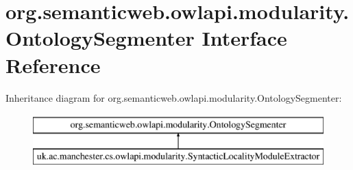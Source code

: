 \hypertarget{interfaceorg_1_1semanticweb_1_1owlapi_1_1modularity_1_1_ontology_segmenter}{\section{org.\-semanticweb.\-owlapi.\-modularity.\-Ontology\-Segmenter Interface Reference}
\label{interfaceorg_1_1semanticweb_1_1owlapi_1_1modularity_1_1_ontology_segmenter}
}
Inheritance diagram for org.\-semanticweb.\-owlapi.\-modularity.\-Ontology\-Segmenter\-:\begin{figure}[H]
\begin{center}
\leavevmode
\includegraphics[height=2.000000cm]{interfaceorg_1_1semanticweb_1_1owlapi_1_1modularity_1_1_ontology_segmenter}
\end{center}
\end{figure}
